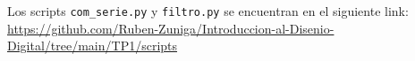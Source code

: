 Los scripts \texttt{com\_serie.py} y \texttt{filtro.py} se encuentran en el siguiente link: \url{https://github.com/Ruben-Zuniga/Introduccion-al-Disenio-Digital/tree/main/TP1/scripts}





